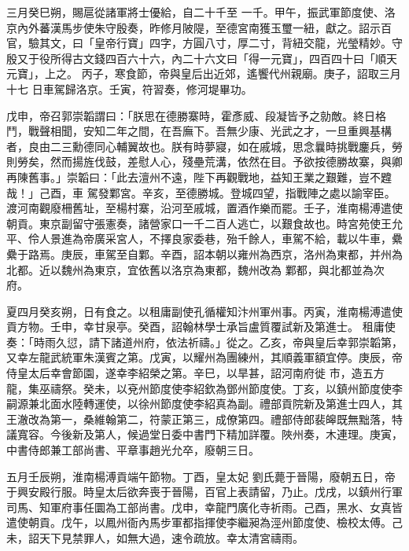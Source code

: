 \begin{pinyinscope}
三月癸巳朔，賜扈從諸軍將士優給，自二十千至
 一千。甲午，振武軍節度使、洛京內外蕃漢馬步使朱守殷奏，昨修月陂隄，至德宮南獲玉璽一紐，獻之。詔示百官，驗其文，曰「皇帝行寶」四字，方圓八寸，厚二寸，背紐交龍，光瑩精妙。守殷又于役所得古文錢四百六十六，內二十六文曰「得一元寶」，四百四十曰「順天元寶」，上之。
 丙子，寒食節，帝與皇后出近郊，遙饗代州親廟。庚子，詔取三月十七
 日車駕歸洛京。壬寅，符習奏，修河堤畢功。



 戊申，帝召郭崇韜謂曰：「朕思在德勝寨時，霍彥威、段凝皆予之勍敵。終日格鬥，戰聲相聞，安知二年之間，在吾廡下。吾無少康、光武之才，一旦重興基構者，良由二三勳德同心輔翼故也。朕有時夢寢，如在戚城，思念曩時挑戰鏖兵，勞則勞矣，然而揚旌伐鼓，差慰人心，殘壘荒溝，依然在目。予欲按德勝故寨，與卿再陳舊事。」崇韜曰：「此去澶州不遠，陛下再觀戰地，益知王業之艱難，豈不韙哉！」己酉，車
 駕發鄴宮。辛亥，至德勝城。登城四望，指戰陣之處以諭宰臣。渡河南觀廢柵舊址，至楊村寨，沿河至戚城，置酒作樂而罷。壬子，淮南楊溥遣使朝貢。東京副留守張憲奏，諸營家口一千二百人逃亡，以艱食故也。時宮苑使王允平、伶人景進為帝廣采宮人，不擇良家委巷，殆千餘人，車駕不給，載以牛車，纍纍于路焉。庚辰，車駕至自鄴。辛酉，詔本朝以雍州為西京，洛州為東都，并州為北都。近以魏州為東京，宜依舊以洛京為東都，魏州改為
 鄴都，與北都並為次府。


夏四月癸亥朔，日有食之。以租庸副使孔循權知汴州軍州事。丙寅，淮南楊溥遣使貢方物。壬申，幸甘泉亭。癸酉，詔翰林學士承旨盧質覆試新及第進士。
 租庸使奏：「時雨久愆，請下諸道州府，依法祈禱。」從之。乙亥，帝與皇后幸郭崇韜第，又幸左龍武統軍朱漢賓之第。戊寅，以耀州為團練州，其順義軍額宜停。庚辰，帝侍皇太后幸會節園，遂幸李紹榮之第。辛巳，以旱甚，詔河南府徙
 市，造五方龍，集巫禱祭。癸未，以兗州節度使李紹欽為鄧州節度使。丁亥，以鎮州節度使李嗣源兼北面水陸轉運使，以徐州節度使李紹真為副。禮部貢院新及第進士四人，其王澈改為第一，桑維翰第二，符蒙正第三，成僚第四。禮部侍郎裴皞既無黜落，特議寬容。今後新及第人，候過堂日委中書門下精加詳覆。陜州奏，木連理。庚寅，中書侍郎兼工部尚書、平章事趙光允卒，廢朝三日。



 五月壬辰朔，淮南楊溥貢端午節物。丁酉，皇太妃
 劉氏薨于晉陽，廢朝五日，帝于興安殿行服。時皇太后欲奔喪于晉陽，百官上表請留，乃止。戊戌，以鎮州行軍司馬、知軍府事任圜為工部尚書。戊申，幸龍門廣化寺祈雨。己酉，黑水、女真皆遣使朝貢。戊午，以鳳州衙內馬步軍都指揮使李繼昶為涇州節度使、檢校太傅。己未，詔天下見禁罪人，如無大過，速令疏放。幸太清宮禱雨。



\end{pinyinscope}
